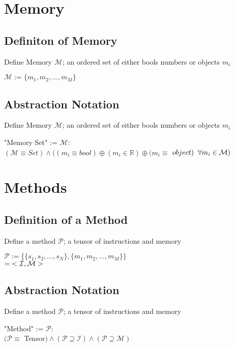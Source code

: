 \documentclass[11pt]{article}
\begin{document}
\section{Memory}
\subsection{Definiton of Memory}
Define Memory $\mathcal{M}$; an ordered set of either bools numbers or objects $m_i$
\begin{center}
$\mathcal{M} := \{m_1,m_2,...,m_M\}$
\end{center}




\subsection{Abstraction Notation}
Define Memory $\mathcal{M}$; an ordered set of either bools numbers or objects $m_i$
\begin{center}
"Memory Set" := $\mathcal{M}:$
\\ \vspace{2mm}
$
(\mathcal{M} \equiv Set) \land((m_i \equiv bool) \oplus (m_i \in \mathbb{R}) \oplus (m_i \equiv$ $object) \hspace{2mm} \forall m_i \in \mathcal{M})
$
\end{center}












\section{Methods}
\subsection{Definition of a Method}
Define a method $\mathcal{P}$; a tensor of instructions and memory
\begin{center}
$
\mathcal{P} := \{ \{s_1, s_2,...,s_{N}\}, \{m_1, m_2,...,m_M\} \}
$
\\ \vspace{2mm}
$
= \hspace{1mm} < \mathcal{I}, \mathcal{M} >
$
\end{center}




\subsection{Abstraction Notation}
Define a method $\mathcal{P}$; a tensor of instructions and memory
\begin{center}
"Method" := $
\mathcal{P} :
$
\\ \vspace{2mm}
$
(\mathcal{P} \equiv$ Tensor$)\land(\mathcal{P} \supseteq \mathcal{I})\land(\mathcal{P} \supseteq \mathcal{M})
$
\end{center}
\end{document}

